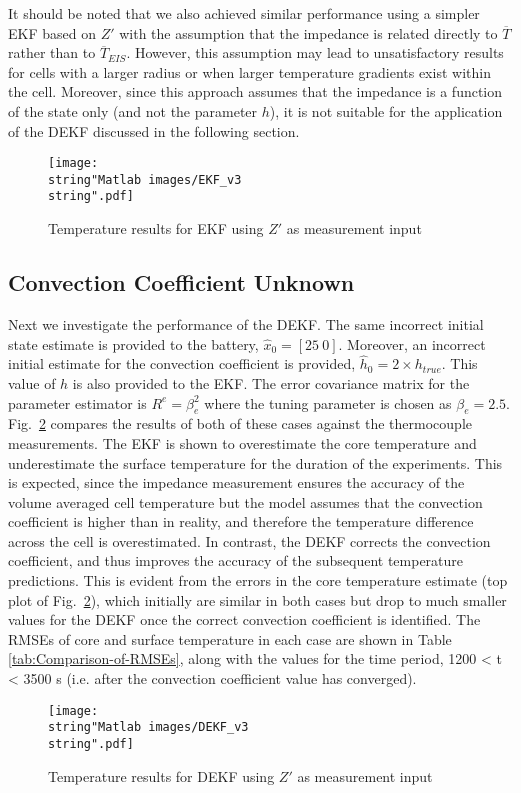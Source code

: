 \documentclass[journal, english]{IEEEtran}
\begin{document}
It should be noted that we also achieved similar performance using
a simpler EKF based on $Z'$ with the assumption that the impedance
is related directly to $\overline{T}$ rather than to 
$\overline{T}_{EIS}$. However, this assumption may lead to unsatisfactory
results for cells with a larger radius or when larger temperature
gradients exist within the cell. Moreover, since this approach assumes that the impedance is a function of the state only (and not the parameter $h$), it is not suitable for the application of the DEKF discussed in the following section.
\begin{figure}\begin{raggedright}
\texttt{[image: \\string"Matlab images/EKF\_v3\\string".pdf]}
\par\end{raggedright}
\caption{Temperature results for EKF using $Z'$ as measurement input\label{fig:EKF}}
\end{figure}

\subsection{Convection Coefficient Unknown\label{sub:Convection-Coefficient-Unkown}}
Next we investigate the performance of the DEKF. The same incorrect
initial state estimate is provided to the battery, $\hat{x}_0=[25\:0]$.
Moreover, an incorrect initial estimate for the convection coefficient
is provided, $\hat{h}_0=2\times h_{true}$. This value of $h$ is also
provided to the EKF. The error covariance matrix for the parameter
estimator is $R^{e}=\beta_{e}^{2}$ where the tuning parameter is
chosen as $\beta_{e}=2.5$. Fig.\ \ref{fig:DEKF-with-Z} compares the
results of both of these cases against the thermocouple measurements.
The EKF is shown to overestimate the core temperature and underestimate
the surface temperature for the duration of the experiments. This
is expected, since the impedance measurement ensures the
accuracy of the volume averaged cell temperature but the model assumes that the convection coefficient is higher than in reality, and therefore 
the temperature difference across the cell is overestimated. In contrast,
the DEKF corrects the convection coefficient, and thus improves the
accuracy of the subsequent temperature predictions. This is evident
from the errors in the core temperature estimate (top plot of Fig.\
\ref{fig:DEKF-with-Z}), which initially are similar in both cases
but drop to much smaller values for the DEKF once the correct convection
coefficient is identified. The RMSEs of core and surface temperature
in each case are shown in Table \ref{tab:Comparison-of-RMSEs}, along
with the values for the time period, 1200 < t < 3500 s (i.e. after
the convection coefficient value has converged). 
\begin{figure}\begin{centering}
\texttt{[image: \\string"Matlab images/DEKF\_v3\\string".pdf]}
\par\end{centering}
\caption{Temperature results for DEKF using $Z'$ as measurement input\label{fig:DEKF-with-Z}}
\end{figure}
\end{document}
